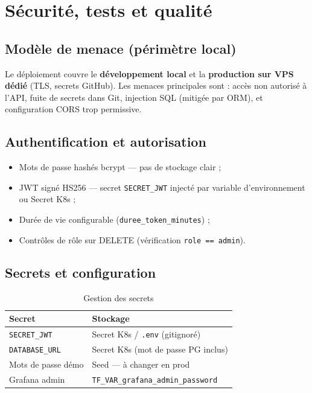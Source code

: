 \chapter{Sécurité, tests et qualité}
\label{ch:securite}

\section{Modèle de menace (périmètre local)}

Le déploiement couvre le \textbf{développement local} et la \textbf{production sur VPS dédié} (TLS, secrets GitHub). Les menaces principales sont : accès non autorisé à l'API, fuite de secrets dans Git, injection SQL (mitigée par ORM), et configuration CORS trop permissive.

\section{Authentification et autorisation}

\begin{itemize}
  \item Mots de passe hashés bcrypt — pas de stockage clair ;
  \item JWT signé HS256 — secret \texttt{SECRET\_JWT} injecté par variable d'environnement ou Secret K8s ;
  \item Durée de vie configurable (\texttt{duree\_token\_minutes}) ;
  \item Contrôles de rôle sur DELETE (vérification \texttt{role == admin}).
\end{itemize}

\section{Secrets et configuration}

\begin{table}[htbp]
  \centering
  \caption{Gestion des secrets}
  \label{tab:secrets}
  \begin{tabular}{@{}ll@{}}
    \toprule
    \textbf{Secret} & \textbf{Stockage} \\
    \midrule
    \texttt{SECRET\_JWT} & Secret K8s / \texttt{.env} (gitignoré) \\
    \texttt{DATABASE\_URL} & Secret K8s (mot de passe PG inclus) \\
    Mots de passe démo & Seed — à changer en prod \\
    Grafana admin & \texttt{TF\_VAR\_grafana\_admin\_password} \\
    \bottomrule
  \end{tabular}
\end{table}

